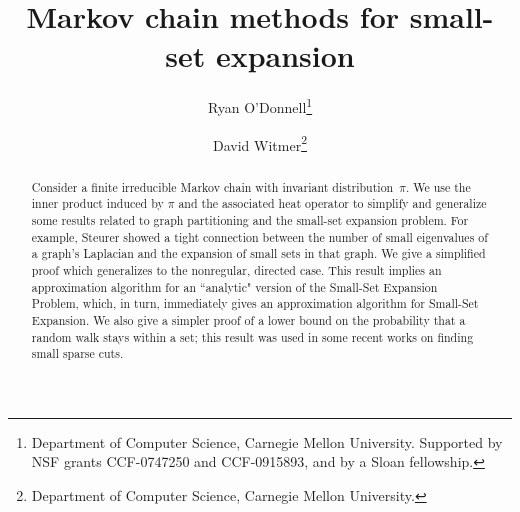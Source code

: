 \documentclass[11pt]{article}
\begin{document}
\title{Markov chain methods for small-set expansion}


\author{Ryan O'Donnell\thanks{Department of Computer Science, Carnegie Mellon University. Supported by NSF grants CCF-0747250 and CCF-0915893, and by a Sloan fellowship.} \and David Witmer\thanks{Department of Computer Science, Carnegie Mellon University.}}

\maketitle

\begin{abstract}
Consider a finite irreducible Markov chain with invariant distribution~$\pi$.  We use the inner product induced by $\pi$ and the associated heat operator to simplify and generalize some results related to graph partitioning and the small-set expansion problem.  For example, Steurer showed a tight connection between the number of small eigenvalues of a graph's Laplacian and the expansion of small sets in that graph. We give a simplified proof which generalizes to the nonregular, directed case. This result implies an approximation algorithm for an ``analytic" version of the Small-Set Expansion Problem, which, in turn, immediately gives an approximation algorithm for Small-Set Expansion.  We also give a simpler proof of a lower bound on the probability that a random walk stays within a set; this result was used in some recent works on finding small sparse cuts.

\end{abstract}
\end{document}
